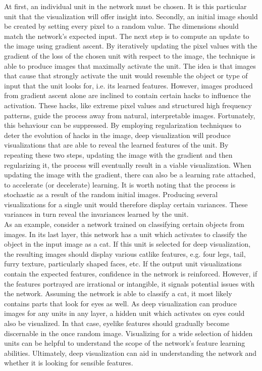 \noindent At first, an individual unit in the network must be chosen. It is this particular unit that the visualization will offer insight into. Secondly, an initial image should be created by setting every pixel to a random value. The dimensions should match the network's expected input. The next step is to compute an update to the image using gradient ascent. By iteratively updating the pixel values with the gradient of the loss of the chosen unit with respect to the image, the technique is able to produce images that maximally activate the unit. The idea is that images that cause that strongly activate the unit would resemble the object or type of input that the unit looks for, i.e. its learned features. However, images produced from gradient ascent alone are inclined to contain certain hacks to influence the activation. These hacks, like extreme pixel values and structured high frequency patterns, guide the process away from natural, interpretable images. Fortunately, this behaviour can be suppressed. By employing regularization techniques to deter the evolution of hacks in the image, deep visualization will produce visualizations that are able to reveal the learned features of the unit. By repeating these two steps, updating the image with the gradient and then regularizing it, the process will eventually result in a viable visualization. When updating the image with the gradient, there can also be a learning rate attached, to accelerate (or decelerate) learning. It is worth noting that the process is stochastic as a result of the random initial images. Producing several visualizations for a single unit would therefore display certain variances. These variances in turn reveal the invariances learned by the unit. \\

\noindent As an example, consider a network trained on classifying certain objects from images. In its last layer, this network has a unit which activates to classify the object in the input image as a cat. If this unit is selected for deep visualization, the resulting images should display various catlike features, e.g. four legs, tail, furry texture, particularly shaped faces, etc. If the output unit visualizations contain the expected features, confidence in the network is reinforced. However, if the features portrayed are irrational or intangible, it signals potential issues with the network. Assuming the network is able to classify a cat, it most likely contains parts that look for eyes as well. As deep visualization can produce images for any units in any layer, a hidden unit which activates on eyes could also be visualized. In that case, eyelike features should gradually become discernable in the once random image. Visualizing for a wide selection of hidden units can be helpful to understand the scope of the network's feature learning abilities. Ultimately, deep visualization can aid in understanding the network and whether it is looking for sensible features. \\


